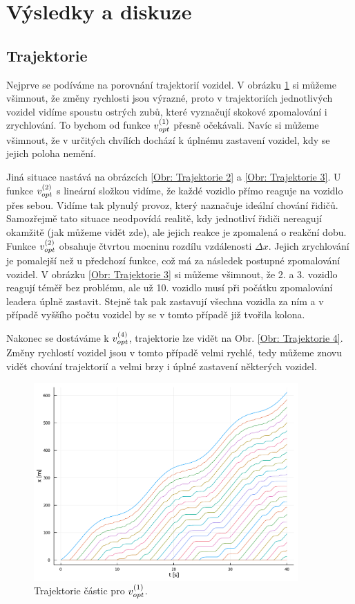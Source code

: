 \documentclass[a4paper, 12pt, fleqn]{article}
\begin{document}
\pagebreak
\section{Výsledky a diskuze}

\subsection{Trajektorie}

Nejprve se podíváme na porovnání trajektorií vozidel. V obrázku \ref{Obr: Trajektorie 1} si můžeme všimnout, že změny rychlosti jsou výrazné, proto v trajektoriích jednotlivých vozidel vidíme spoustu ostrých zubů, které vyznačují skokové zpomalování i zrychlování. To bychom od funkce $v_{opt}^{(1)}$ přesně očekávali. Navíc si můžeme všimnout, že v určitých chvílích dochází k úplnému zastavení vozidel, kdy se jejich poloha nemění.

Jiná situace nastává na obrázcích \ref{Obr: Trajektorie 2} a \ref{Obr: Trajektorie 3}. U funkce $v_{opt}^{(2)}$ s lineární složkou vidíme, že každé vozidlo přímo reaguje na vozidlo přes sebou. Vidíme tak plynulý provoz, který naznačuje ideální chování řidičů. Samozřejmě tato situace neodpovídá realitě, kdy jednotliví řidiči nereagují okamžitě (jak můžeme vidět zde), ale jejich reakce je zpomalená o reakční dobu. Funkce  $v_{opt}^{(2)}$ obsahuje čtvrtou mocninu rozdílu vzdálenosti $\Delta x$. Jejich zrychlování je pomalejší než u předchozí funkce, což má za následek postupné zpomalování vozidel. V obrázku \ref{Obr: Trajektorie 3} si můžeme všimnout, že 2. a 3. vozidlo reagují téměř bez problému, ale už 10. vozidlo musí při počátku zpomalování leadera úplně zastavit. Stejně tak pak zastavují všechna vozidla za ním a v případě vyššího počtu vozidel by se v tomto případě již tvořila kolona.

Nakonec se dostáváme k $v_{opt}^{(4)}$, trajektorie lze vidět na Obr. \ref{Obr: Trajektorie 4}. Změny rychlostí vozidel jsou v tomto případě velmi rychlé, tedy můžeme znovu vidět  chování trajektorií a velmi brzy i úplné zastavení některých vozidel.

\begin{figure}
	\centering
	\includegraphics[width=0.9\textwidth]{images/trajektorie_1.pdf}
	\caption{Trajektorie částic pro $v_{opt}^{(1)}$.}
	\label{Obr: Trajektorie 1}
\end{figure}
\end{document}
